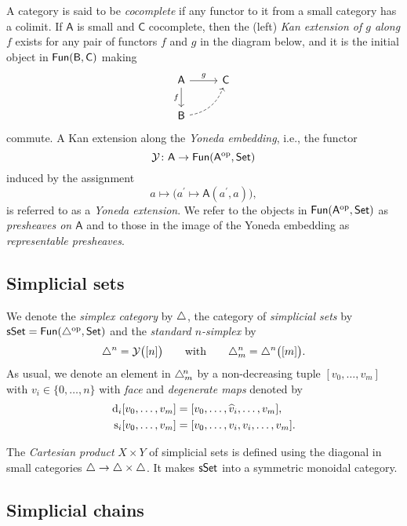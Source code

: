 A category is said to be \textit{cocomplete} if any functor to it from a small category has a colimit.
If $\mathsf{A}$ is small and $\mathsf{C}$ cocomplete, then the (left) \textit{Kan extension of $g$ along $f$} exists for any pair of functors $f$ and $g$ in the diagram below, and it is the initial object in $\mathsf{Fun}(\mathsf{B}, \mathsf{C})$ making
\begin{equation*}
\begin{tikzcd}[column sep=normal, row sep=normal]
\mathsf{A} \arrow[d, "f"'] \arrow[r, "g"] & \mathsf{C} \\
\sB \arrow[dashed, ur, bend right] & \quad
\end{tikzcd}
\end{equation*}
commute.
A Kan extension along the \textit{Yoneda embedding}, i.e., the functor
\[
\mathcal{Y} \colon \mathsf{A} \to \mathsf{Fun}(\mathsf{A}^{\mathrm{op}}, \mathsf{Set})
\]
induced by the assignment
\[
a \mapsto \big( a^\prime \mapsto \mathsf{A}(a^\prime, a) \big),
\]
is referred to as a \textit{Yoneda extension}.
We refer to the objects in $\mathsf{Fun}(\mathsf{A}^{\mathrm{op}}, \mathsf{Set})$ as \textit{presheaves on $\mathsf{A}$} and to those in the image of the Yoneda embedding as \textit{representable presheaves}.

\subsection{Simplicial sets}

We denote the \textit{simplex category} by $\triangle$, the category of \textit{simplicial sets} by $\mathsf{sSet} = \mathsf{Fun}(\triangle^{\mathrm{op}}, \mathsf{Set})$ and the \textit{standard $n$-simplex} by
\[
\triangle^n = \mathcal{Y} \big( [n] \big)
\qquad \text{with} \qquad
\triangle^n_m = \triangle^n \big( [m] \big).
\]
As usual, we denote an element in $\triangle^{\!n}_m$ by a non-decreasing tuple $[v_0, \dots, v_m]$ with $v_i \in \{0, \dots, n\}$ with \textit{face} and \textit{degenerate maps} denoted by
\begin{align*}
\operatorname{d}_i [v_0, \dots, v_m] & = [v_0, \dots, \widehat v_i, \dots, v_m], \\
\operatorname{s}_i [v_0, \dots, v_m] & = [v_0, \dots, v_i, v_i, \dots, v_m].
\end{align*}

The \textit{Cartesian product} $X \times Y$ of simplicial sets is defined using the diagonal in small categories $\triangle \to \triangle \times \triangle$.
It makes $\mathsf{sSet}$ into a symmetric monoidal category.

\subsection{Simplicial chains}

